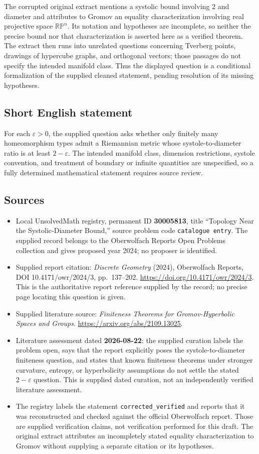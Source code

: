 \documentclass[11pt]{article}
\begin{document}
The corrupted original extract mentions a systolic bound involving $2$ and diameter and attributes to Gromov an equality characterization involving real projective space $\mathbb{RP}^{n}$. Its notation and hypotheses are incomplete, so neither the precise bound nor that characterization is asserted here as a verified theorem. The extract then runs into unrelated questions concerning Tverberg points, drawings of hypercube graphs, and orthogonal vectors; those passages do not specify the intended manifold class. Thus the displayed question is a conditional formalization of the supplied cleaned statement, pending resolution of its missing hypotheses.
\subsection{Short English statement}
For each $\varepsilon>0$, the supplied question asks whether only finitely many homeomorphism types admit a Riemannian metric whose systole-to-diameter ratio is at least $2-\varepsilon$. The intended manifold class, dimension restrictions, systole convention, and treatment of boundary or infinite quantities are unspecified, so a fully determined mathematical statement requires source review.
\subsection{Sources}
\begin{itemize}
\item Local UnsolvedMath registry, permanent ID \textbf{30005813}, title ``Topology Near the Systolic-Diameter Bound,'' source problem code \texttt{catalogue entry}. The supplied record belongs to the Oberwolfach Reports Open Problems collection and gives proposed year 2024; no proposer is identified.
\item Supplied report citation: \emph{Discrete Geometry} (2024), Oberwolfach Reports, DOI 10.4171/owr/2024/3, pp.~137--202. \url{https://doi.org/10.4171/owr/2024/3}. This is the authoritative report reference supplied by the record; no precise page locating this question is given.
\item Supplied literature source: \emph{Finiteness Theorems for Gromov-Hyperbolic Spaces and Groups}. \url{https://arxiv.org/abs/2109.13025}.
\item Literature assessment dated \textbf{2026-08-22}: the supplied curation labels the problem open, says that the report explicitly poses the systole-to-diameter finiteness question, and states that known finiteness theorems under stronger curvature, entropy, or hyperbolicity assumptions do not settle the stated $2-\varepsilon$ question. This is supplied dated curation, not an independently verified literature assessment.
\item The registry labels the statement \texttt{corrected\_verified} and reports that it was reconstructed and checked against the official Oberwolfach report. Those are supplied verification claims, not verification performed for this draft. The original extract attributes an incompletely stated equality characterization to Gromov without supplying a separate citation or its hypotheses.
\end{itemize}
\end{document}

